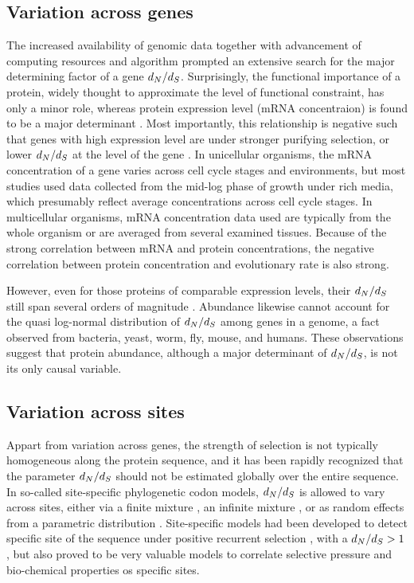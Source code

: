 \subsection{Variation across genes}

The increased availability of genomic data together with advancement of computing resources and algorithm prompted an extensive search for the major determining factor of a gene $d_N / d_S$.
Surprisingly, the functional importance of a protein, widely thought to approximate the level of functional constraint, has only a minor role, whereas protein expression level (mRNA concentraion) is found to be a major determinant \citep{Zhang2015}.
Most importantly, this relationship is negative such that genes with high expression level are under stronger purifying selection, or lower $d_N / d_S$ at the level of the gene \citep{Duret2000, Drummond2005a, Zhang2015}.
In unicellular organisms, the mRNA concentration of a gene varies across cell cycle stages and environments, but most studies used data collected from the mid-log phase of growth under rich media, which presumably reflect average concentrations across cell cycle stages.
In multicellular organisms, mRNA concentration data used are typically from the whole organism or are averaged from several examined tissues.
Because of the strong correlation between mRNA and protein concentrations, the negative correlation between protein concentration and evolutionary rate is also strong.

However, even for those proteins of comparable expression levels, their $d_N / d_S$ still span several orders of magnitude \citep{Drummond2008}.
Abundance likewise cannot account for the quasi log-normal distribution of $d_N / d_S$ among genes in a genome, a fact observed from bacteria, yeast, worm, fly, mouse, and humans.
These observations suggest that protein abundance, although a major determinant of $d_N / d_S$, is not its only causal variable.

\subsection{Variation across sites}

Appart from variation across genes, the strength of selection is not typically homogeneous along the protein sequence, and it has been rapidly recognized that the parameter $d_N / d_S$ should not be estimated globally over the entire sequence.
In so-called site-specific phylogenetic \gls{codon} models, $d_N / d_S$ is allowed to vary across sites, either via a finite mixture \citep{Yang2001}, an infinite mixture \citep{Huelsenbeck2006}, or as random effects from a parametric distribution \citep{Lartillot2013}.
Site-specific models had been developed to detect specific site of the sequence under positive recurrent selection \citep{kosiol_patterns_2008}, with a $d_N / d_S>1$, but also proved to be very valuable models to correlate selective pressure and bio-chemical properties os specific sites.

